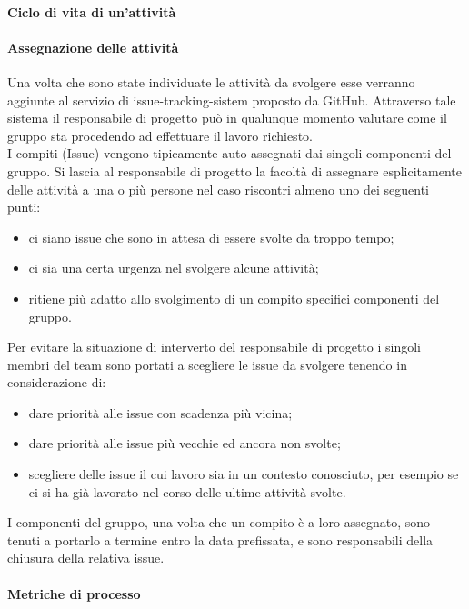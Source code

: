 \paragraph{Ciclo di vita di un'attività}


\paragraph{Assegnazione delle attività}
Una volta che sono state individuate le attività da svolgere esse verranno aggiunte al servizio di issue-tracking-sistem proposto da GitHub.
Attraverso tale sistema il responsabile di progetto può in qualunque momento valutare come il gruppo sta procedendo ad effettuare il lavoro richiesto.\\
I compiti (Issue) vengono tipicamente auto-assegnati dai singoli componenti del gruppo. Si lascia al responsabile di progetto la facoltà di assegnare esplicitamente delle attività a una o più persone nel caso riscontri almeno uno dei seguenti punti:
\begin{itemize}
    \item ci siano issue che sono in attesa di essere svolte da troppo tempo;
    \item ci sia una certa urgenza nel svolgere alcune attività;
    \item ritiene più adatto allo svolgimento di un compito specifici componenti del gruppo.
\end{itemize}
Per evitare la situazione di interverto del responsabile di progetto i singoli membri del team sono portati a scegliere le issue da svolgere tenendo in considerazione di:
\begin{itemize}
    \item dare priorità alle issue con scadenza più vicina;
    \item dare priorità alle issue più vecchie ed ancora non svolte;
    \item scegliere delle issue il cui lavoro sia in un contesto conosciuto, per esempio se ci si ha già lavorato nel corso delle ultime attività svolte.
\end{itemize}
I componenti del gruppo, una volta che un compito è a loro assegnato, sono tenuti a portarlo a termine entro la data prefissata, e sono responsabili della chiusura della relativa issue.

\paragraph{Metriche di processo}

